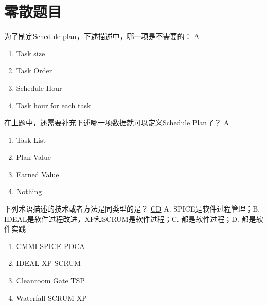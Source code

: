 \section{零散题目}
\begin{problem}
    为了制定Schedule plan，下述描述中，哪一项是不需要的：
    \uline{A}
    \vspace{-0.8em}
    \begin{multicols}{2}
        \begin{enumerate}[label=\Alph*.]
            \item Task size
            \item Task Order
            \item Schedule Hour
            \item Task hour for each task
        \end{enumerate}
    \end{multicols}
    \vspace{-1em}
\end{problem}

\begin{problem}
    在上题中，还需要补充下述哪一项数据就可以定义Schedule Plan了？
    \uline{A}
    \vspace{-0.8em}
    \begin{multicols}{4}
        \begin{enumerate}[label=\Alph*.]
            \item Task List
            \item Plan Value
            \item Earned Value
            \item Nothing
        \end{enumerate}
    \end{multicols}
    \vspace{-1em}
\end{problem}

\begin{problem}
    下列术语描述的技术或者方法是同类型的是？
    \uline{CD}    {\kaishu A. SPICE是软件过程管理；B. IDEAL是软件过程改进，XP和SCRUM是软件过程；C. 都是软件过程；D. 都是软件实践}
    \vspace{-0.8em}
    \begin{multicols}{2}
        \begin{enumerate}[label=\Alph*.]
            \item CMMI SPICE PDCA
            \item IDEAL XP SCRUM
            \item Cleanroom Gate TSP
            \item Waterfall SCRUM XP
        \end{enumerate}
    \end{multicols}
    \vspace{-1em}
\end{problem}

